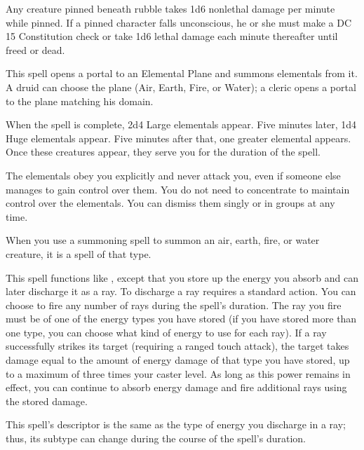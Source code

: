 \begin{spellnotes}
  Any creature pinned beneath rubble takes 1d6 nonlethal damage per minute while pinned. If a pinned character falls unconscious, he or she must make a DC 15 Constitution check or take 1d6 lethal damage each minute thereafter until freed or dead.
\end{spellnotes}

\spellrng{\rngmed}
\begin{spelleffect}
  This spell opens a portal to an Elemental Plane and summons elementals from it. A druid can choose the plane (Air, Earth, Fire, or Water); a cleric opens a portal to the plane matching his domain.
  \par When the spell is complete, 2d4 Large elementals appear. Five minutes later, 1d4 Huge elementals appear. Five minutes after that, one greater elemental appears. Once these creatures appear, they serve you for the duration of the spell.
  \par The elementals obey you explicitly and never attack you, even if someone else manages to gain control over them. You do not need to concentrate to maintain control over the elementals. You can dismiss them singly or in groups at any time.
  \par When you use a summoning spell to summon an air, earth, fire, or water creature, it is a spell of that type.
\end{spelleffect}

\begin{spelleffect}
  This spell functions like , except that you store up the energy you absorb and can later discharge it as a ray. To discharge a ray requires a standard action. You can choose to fire any number of rays during the spell's duration. The ray you fire must be of one of the energy types you have stored (if you have stored more than one type, you can choose what kind of energy to use for each ray). If a ray successfully strikes its target (requiring a ranged touch attack), the target takes damage equal to the amount of energy damage of that type you have stored, up to a maximum of three times your caster level. As long as this power remains in effect, you can continue to absorb energy damage and fire additional rays using the stored damage.
\end{spelleffect}
\begin{spellnotes}
  This spell's descriptor is the same as the type of energy you discharge in a ray; thus, its subtype can change during the course of the spell's duration.
\end{spellnotes}

